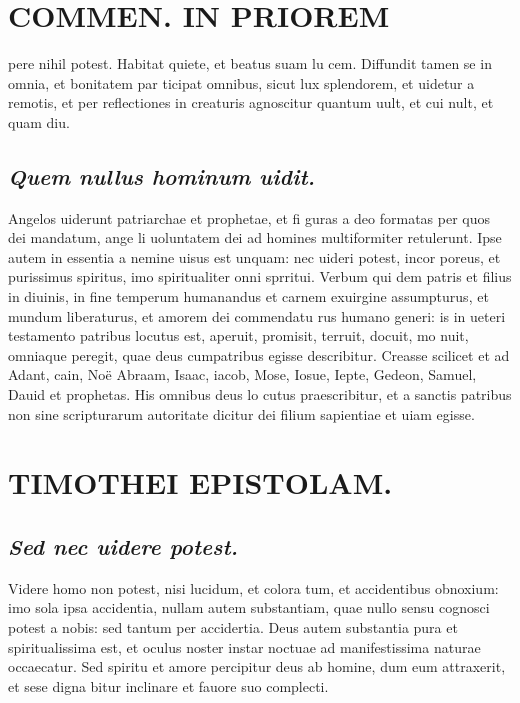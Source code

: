 \documentclass{article}
\begin{document}
\begin{pages}
\section*{COMMEN. IN PRIOREM }
\marginpar{[ p.178 ]}\pstart pere nihil potest. Habitat quiete, et beatus suam lu cem. Diffundit tamen se in omnia, et bonitatem par ticipat omnibus, sicut lux splendorem, et uidetur a remotis, et per reflectiones in creaturis agnoscitur quantum uult, et cui nult, et quam diu.  \pend
{}
{}
\subsection*{\textit{Quem nullus hominum uidit. }}\pstart Angelos uiderunt patriarchae et prophetae, et fi guras a deo formatas per quos dei mandatum, ange li uoluntatem dei ad homines multiformiter retulerunt. Ipse autem in essentia a nemine uisus est unquam: nec uideri potest, incor poreus, et purissimus spiritus, imo spiritualiter onni sprritui. Verbum qui dem patris et filius in diuinis, in fine temperum humanandus et carnem exuirgine assumpturus, et mundum liberaturus, et amorem dei commendatu rus humano generi: is in ueteri testamento patribus locutus est, aperuit, promisit, terruit, docuit, mo nuit, omniaque peregit, quae deus cumpatribus egisse describitur. Creasse scilicet et ad Adant, cain, Noë Abraam, Isaac, iacob, Mose, Iosue, Iepte, Gedeon, Samuel, Dauid et prophetas. His omnibus deus lo cutus praescribitur, et a sanctis patribus non sine scripturarum autoritate dicitur dei filium sapientiae et uiam egisse.  \pend
\section*{TIMOTHEI EPISTOLAM. }
\marginpar{[ p.179 ]}
{}
\subsection*{\textit{Sed nec uidere potest. }}\pstart Videre homo non potest, nisi lucidum, et colora tum, et accidentibus obnoxium: imo sola ipsa accidentia, nullam autem substantiam, quae nullo sensu cognosci potest a nobis: sed tantum per accidertia. Deus autem substantia pura et spiritualissima est, et oculus noster instar noctuae ad manifestissima naturae occaecatur. Sed spiritu et amore percipitur deus ab homine, dum eum attraxerit, et sese digna bitur inclinare et fauore suo complecti.  \pend
{}
{}

\end{pages}
\end{document}
